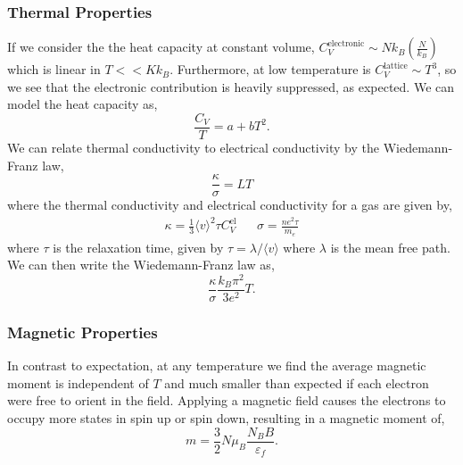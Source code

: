 \documentclass{book}
\begin{document}
\subsubsection{Thermal Properties}
If we consider the the heat capacity at constant volume, $C_V^{\text{electronic}} \sim Nk_B\left(\frac{N}{k_B}\right)$ which is linear in $T << Kk_B$. Furthermore, at low temperature is $C_V^{\text{lattice}} \sim T^3$, so we  see that the electronic contribution is heavily suppressed, as expected. We can model the heat capacity as,
\begin{equation}
	\frac{C_V}{T} = a + bT^2.
\end{equation}
We can relate thermal conductivity to electrical conductivity by the Wiedemann-Franz law,
\begin{equation}
	\frac{\kappa}{\sigma} = LT
\end{equation}
where the thermal conductivity and electrical conductivity for a gas are given by,
\begin{align}
	\kappa = \frac{1}{3}\langle v\rangle^2\tau C_V^{\text{el}} && \sigma = \frac{ne^2\tau}{m_e}
\end{align}
where $\tau$ is the relaxation time, given by $\tau = \lambda/\langle v \rangle$ where $\lambda$ is the mean free path. We can then write the Wiedemann-Franz law as,
\begin{equation}
	\frac{\kappa}{\sigma} \frac{k_B\pi^2}{3e^2}T.
\end{equation}
\subsubsection{Magnetic Properties}
In contrast to expectation, at any temperature we find the average magnetic moment is independent of $T$ and much smaller than expected if each electron were free to orient in the field. Applying a magnetic field causes the electrons to occupy more states in spin up or spin down, resulting in a magnetic moment of,
\begin{equation}
	m = \frac{3}{2}N\mu_B \frac{N_BB}{\varepsilon_f}.
\end{equation}
\end{document}
